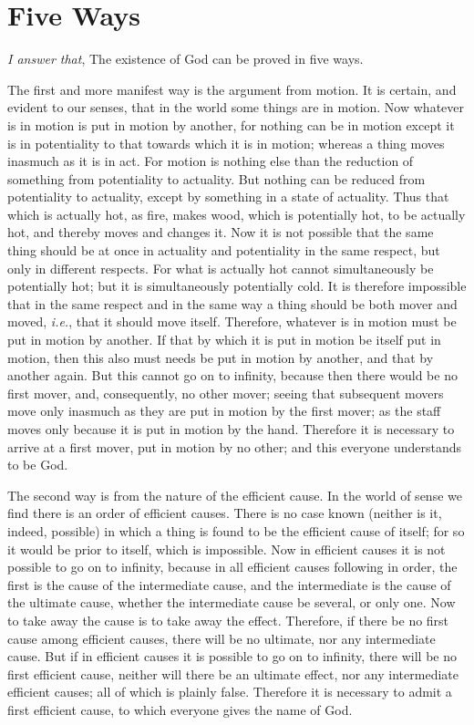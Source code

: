 
\author{Thomas Aquinas}
\chapter{Five Ways}

\noindent \textit{I answer that}, The existence of God can be
proved in five ways.

The first and more manifest way is the argument from motion. It is
certain, and evident to our senses, that in the world some things are
in motion. Now whatever is in motion is put in motion by another, for
nothing can be in motion except it is in potentiality to that towards
which it is in motion; whereas a thing moves inasmuch as it is in act.
For motion is nothing else than the reduction of something from
potentiality to actuality. But nothing can be reduced from
potentiality to actuality, except by something in a state of
actuality. Thus that which is actually hot, as fire, makes wood, which
is potentially hot, to be actually hot, and thereby moves and changes
it. Now it is not possible that the same thing should be at once in
actuality and potentiality in the same  respect, but only in
different respects. For what is actually hot cannot simultaneously be
potentially hot; but it is simultaneously potentially cold. It is
therefore impossible that in the same respect and in the same way a
thing should be both mover and moved, \textit{i.e.}, that it should
move itself. Therefore, whatever is in motion must be put in motion by
another. If that by which it is put in motion be itself put in motion,
then this also must needs be put in motion by another, and that by
another again. But this cannot go on to infinity, because then there
would be no first mover, and, consequently, no other mover; seeing
that subsequent movers move only inasmuch as they are put in motion by
the first mover; as the staff moves only because it is put in motion
by the hand. Therefore it is necessary to arrive at a first mover, put
in motion by no other; and this everyone understands to be God.

The second way is from the nature of the efficient cause. In the world
of sense we find there is an order of efficient causes. There is no
case known (neither is it, indeed, possible) in which a thing is found
to be the efficient cause of itself; for so it would be prior to
itself, which is impossible. Now in efficient causes it is not
possible to go on to infinity, because in all efficient causes
following in order, the first is the cause of the intermediate cause,
and the intermediate is the cause of the ultimate cause, whether the
intermediate cause be several, or only one. Now to take away the cause
is to take away the effect. Therefore, if there be no first cause
among efficient causes, there will be no ultimate, nor any
intermediate cause. But if in efficient causes it is possible to go on
to infinity, there will be no first efficient cause, neither will
there be an ultimate effect, nor any intermediate efficient causes;
all of which is plainly false. Therefore it is necessary to admit a
first efficient cause, to which everyone gives the name of God.

